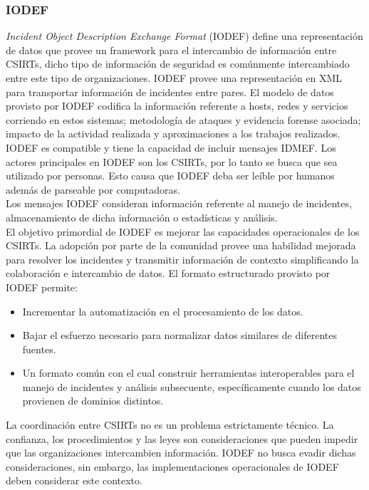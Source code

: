 \subsubsection{IODEF}

\textit{Incident Object Description Exchange Format} (IODEF) define una representación de datos que provee un framework para el 
intercambio de información entre CSIRTs, dicho tipo de información de seguridad 
es comúnmente intercambiado entre este tipo de organizaciones. IODEF provee una 
representación en XML para transportar información de incidentes entre pares. El modelo de datos provisto por IODEF codifica la información 
referente a hosts, redes y servicios corriendo en estos sistemas; metodología 
de ataques y evidencia forense asociada; impacto de la actividad realizada y
aproximaciones a los trabajos realizados.\\

IODEF es compatible y tiene la capacidad de incluir mensajes 
IDMEF. Los actores principales en IODEF son los CSIRTs, por lo tanto se busca que sea utilizado por personas. Esto causa que IODEF deba ser leíble por humanos además de parseable por computadoras.\\

Los mensajes IODEF consideran 
información referente al manejo de incidentes, almacenamiento de dicha 
información o estadísticas y análisis.\\

El objetivo primordial de IODEF es mejorar las capacidades operacionales de los 
CSIRTs. La adopción por parte de la comunidad provee una habilidad mejorada para 
resolver los incidentes y transmitir información de contexto simplificando la 
colaboración e intercambio de datos.
El formato estructurado provisto por IODEF permite:
\begin{itemize}
  \item Incrementar la automatización en el procesamiento de los datos.
  \item Bajar el esfuerzo necesario para normalizar datos similares de 
  diferentes fuentes.
  \item Un formato común con el cual construir herramientas interoperables para 
  el manejo de incidentes y análisis subsecuente, específicamente cuando 
  los datos provienen de dominios distintos.
\end{itemize}

La coordinación entre CSIRTs no es un problema estrictamente técnico. La 
confianza, los procedimientos y las leyes son consideraciones que pueden impedir 
que las organizaciones intercambien información. IODEF no busca evadir dichas 
consideraciones, sin embargo, las implementaciones operacionales de IODEF deben 
considerar este contexto.